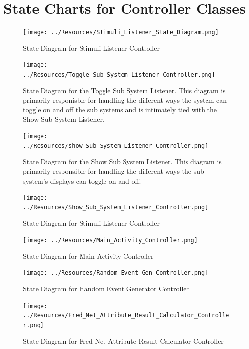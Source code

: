 \documentclass[]{article}
\begin{document}
\section{State Charts for Controller Classes}
\label{sec:state_charts_for_controller_classes}
\begin{figure}[H]
	\centering
	\texttt{[image: ../Resources/Stimuli\_Listener\_State\_Diagram.png]}
	\caption{State Diagram for Stimuli Listener Controller}
\end{figure}
\begin{figure}[H]
	\centering
	\texttt{[image: ../Resources/Toggle\_Sub\_System\_Listener\_Controller.png]}
	\caption{State Diagram for the Toggle Sub System Listener. This diagram is primarily responisble for handling the different ways the system can toggle on and off the sub systems and is intimately tied with the Show Sub System Listener. }
\end{figure}
\begin{figure}[H]
	\centering
	\texttt{[image: ../Resources/show\_Sub\_System\_Listener\_Controller.png]}
	\caption{State Diagram for the Show Sub System Listener. This diagram is primarily responsible for handling the different ways the sub system's displays can toggle on and off.}
\end{figure}
\begin{figure}[H]
	\centering
	\texttt{[image: ../Resources/Show\_Sub\_System\_Listener\_Controller.png]}
	\caption{State Diagram for Stimuli Listener Controller}
\end{figure}
\begin{figure}[H]
	\centering
	\texttt{[image: ../Resources/Main\_Activity\_Controller.png]}
	\caption{State Diagram for Main Activity Controller}
\end{figure}

\begin{figure}[H]
	\centering
	\texttt{[image: ../Resources/Random\_Event\_Gen\_Controller.png]}
	\caption{State Diagram for Random Event Generator Controller}
\end{figure}

\begin{figure}[H]
	\centering
	\texttt{[image: ../Resources/Fred\_Net\_Attribute\_Result\_Calculator\_Controller.png]}
	\caption{State Diagram for Fred Net Attribute Result Calculator Controller}
\end{figure}

\end{document}
